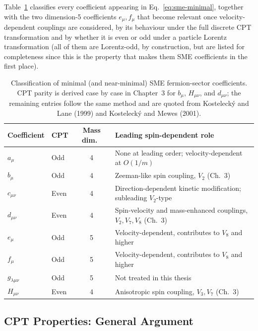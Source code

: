\documentclass[main]{subfiles}
\begin{document}
Table~\ref{tab:sme-classification} classifies every coefficient appearing in
Eq.~\eqref{eq:sme-minimal}, together with the two dimension-5 coefficients
$e_\mu,f_\mu$ that become relevant once velocity-dependent couplings are
considered, by its behaviour under the full discrete CPT transformation and
by whether it is even or odd under a particle Lorentz transformation (all of
them are Lorentz-odd, by construction, but are listed for completeness since
this is the property that makes them SME coefficients in the first place).

\begin{table}[h]
\centering
\begin{tabular}{@{}llc>{\raggedright\arraybackslash}p{6.5cm}@{}}
\toprule
Coefficient & CPT & Mass dim.\ & Leading spin-dependent role \\
\midrule
$a_\mu$        & Odd  & 4 & None at leading order; velocity-dependent at $O(1/m)$ \\
$b_\mu$        & Odd  & 4 & Zeeman-like spin coupling, $V_2$ (Ch.~3) \\
$c_{\mu\nu}$   & Even & 4 & Direction-dependent kinetic modification; subleading $V_2$-type \\
$d_{\mu\nu}$   & Even & 4 & Spin-velocity and mass-enhanced couplings, $V_2,V_7,V_8$ (Ch.~3) \\
$e_\mu$        & Odd  & 5 & Velocity-dependent, contributes to $V_8$ and higher \\
$f_\mu$        & Odd  & 5 & Velocity-dependent, contributes to $V_8$ and higher \\
$g_{\lambda\mu\nu}$ & Odd & 5 & Not treated in this thesis \\
$H_{\mu\nu}$   & Even & 4 & Anisotropic spin coupling, $V_3,V_7$ (Ch.~3) \\
\bottomrule
\end{tabular}
\caption{Classification of minimal (and near-minimal) SME fermion-sector
coefficients. CPT parity is derived case by case in Chapter~3 for $b_\mu$,
$H_{\mu\nu}$, and $d_{\mu\nu}$; the remaining entries follow the same method
and are quoted from Kostelecký and Lane (1999) and Kostelecký and Mewes
(2001).}
\label{tab:sme-classification}
\end{table}

\subsection{CPT Properties: General Argument}
\label{sec:cpt-general}
\end{document}
